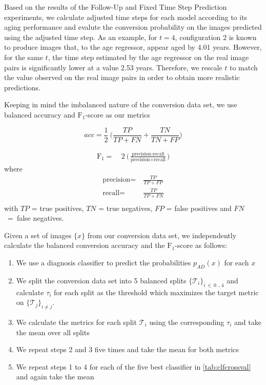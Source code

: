Based on the results of the Follow-Up and Fixed Time Step Prediction experiments, we calculate adjusted time steps for each model according to its aging performance and evalute the conversion probability on the images predicted using the adjusted time step. As an example, for $t = 4$, configuration 2 is known to produce images that, to the age regressor, appear aged by 4.01 years. However, for the same $t$, the time step estimated by the age regressor on the real image pairs is significantly lower at a value 2.53 years. Therefore, we rescale $t$ to match the value observed on the real image pairs in order to obtain more realistic predictions.

Keeping in mind the imbalanced nature of the conversion data set, we use balanced accuracy and $\text{F}_1$-score as our metrics

\begin{equation}
	acc = \frac{1}{2}\ \bigg(\frac{TP}{TP + FN} + \frac{TN}{TN + FP}\bigg)
\end{equation}

\begin{equation}
	\begin{split}
		\text{F}_1 =&\ 2\ \bigg(\frac{\text{precision} \cdot \text{recall}}{\text{precision} + \text{recall}}\bigg)
	\end{split}
\end{equation}
where
\begin{equation*}
	\begin{split}
	\text{precision} =& \ \frac{TP}{TP + FP} \\[8pt]
		\text{recall} =& \ \frac{TP}{TP + FN} \\[8pt]
	\end{split}
\end{equation*}
with $TP$ = true positives, $TN$ = true negatives, $FP$ = false positives and $FN$~=~false negatives.

Given a set of images $\{x\}$ from our conversion data set, we independently calculate the balanced conversion accuracy and the $\text{F}_1$-score as follows:
\begin{enumerate}
	\item We use a diagnosis classifier to predict the probabilities $p_{AD}(x)$ for each $x$
	\item We split the conversion data set into 5 balanced splits $\{\mathcal{T}_i\}_{i\ \in\ 0\ ..\ 4}$ and calculate $\tau_i$ for each split as the threshold which maximizes the target metric on $\{\mathcal{T}_j\}_{i \neq j}$.
	\item We calculate the metrics for each split $\mathcal{T}_i$ using the corresponding $\tau_i$ and take the mean over all splits
	\item We repeat steps 2 and 3 five times and take the mean for both metrics
	\item We repeat steps 1 to 4 for each of the five best classifier in \autoref{tab:clfcrossval} and again take the mean
\end{enumerate}

